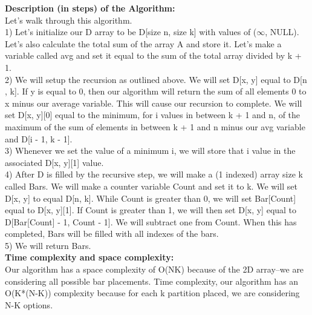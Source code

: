 \documentclass[11pt, solution, letterpaper]{format}
\begin{document}
\textbf{Description (in steps) of the Algorithm:}\\
Let's walk through this algorithm.\\
1) Let's initialize our D array to be D[size n, size k] with values of ($\infty$, NULL). Let's also calculate the total sum of the array A and store it. Let's make a variable called avg and set it equal to the sum of the total array divided by k + 1.\\
2) We will setup the recursion as outlined above. We will set D[x, y] equal to D[n , k]. If y is equal to 0, then our algorithm will return the sum of all elements 0 to x minus our average variable. This will cause our recursion to complete. We will set D[x, y][0] equal to the minimum, for i values in between k + 1 and n, of the maximum of the sum of elements in between k + 1 and n minus our avg variable and D[i - 1, k - 1]. \\
3) Whenever we set the value of a minimum i, we will store that i value in the associated D[x, y][1] value.\\
4) After D is filled by the recursive step, we will make a (1 indexed) array size k called Bars. We will make a counter variable Count and set it to k. We will set D[x, y] to equal D[n, k]. While Count is greater than 0, we will set Bar[Count] equal to D[x, y][1]. If Count is greater than 1, we will then set D[x, y] equal to D[Bar[Count] - 1, Count - 1]. We will subtract one from Count. When this has completed, Bars will be filled with all indexes of the bars. \\
5) We will return Bars.\\

\textbf{Time complexity and space complexity:}\\ Our algorithm has a space complexity of O(NK) because of the 2D array--we are considering all possible bar placements. Time complexity, our algorithm has an O(K*(N-K)) complexity because for each k partition placed, we are considering N-K options. \\
\end{document}
